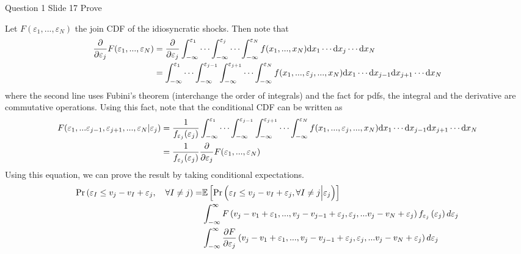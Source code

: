 \documentclass{article}
\begin{document}
\begin{problem}{Question 1 Slide 17}
Prove
\end{problem}
\begin{solution}
Let $F(\varepsilon_1,...,\varepsilon_N)$ the join CDF of the idiosyncratic shocks. Then note that
\begin{align*}
    \frac{\partial }{\partial \varepsilon_j}F(\varepsilon_1,...,\varepsilon_N) &= \frac{\partial }{\partial \varepsilon_j} \int_{-\infty}^{\varepsilon_1}\cdots\int_{-\infty}^{\varepsilon_j}\cdots\int_{-\infty}^{\varepsilon_N} f(x_1,...,x_N)\mathrm{d}x_1\cdots\mathrm{d}x_j\cdots\mathrm{d}x_N \\
     &= \int_{-\infty}^{\varepsilon_1}\cdots\int_{-\infty}^{\varepsilon_{j-1}}\int_{-\infty}^{\varepsilon_{j+1}}\cdots\int_{-\infty}^{\varepsilon_N} f(x_1,...,\varepsilon_j,...,x_N)\mathrm{d}x_1\cdots\mathrm{d}x_{j-1}\mathrm{d}x_{j+1}\cdots\mathrm{d}x_N
\end{align*}
where the second line uses Fubini's theorem (interchange the order of integrals) and the fact for pdfs, the integral and the derivative are commutative operations. Using this fact, note that the conditional CDF can be written as 
\begin{align*}
    F(\varepsilon_1,...\varepsilon_{j-1},\varepsilon_{j+1},...,\varepsilon_N\vert\varepsilon_j) &= \frac{1}{f_{\varepsilon_j}(\varepsilon_j)} \int_{-\infty}^{\varepsilon_1}\cdots\int_{-\infty}^{\varepsilon_{j-1}}\int_{-\infty}^{\varepsilon_{j+1}}\cdots\int_{-\infty}^{\varepsilon_N} f(x_1,...,\varepsilon_j,...,x_N)\mathrm{d}x_1\cdots\mathrm{d}x_{j-1}\mathrm{d}x_{j+1}\cdots\mathrm{d}x_N \\ 
    &=\frac{1}{f_{\varepsilon_j}(\varepsilon_j)} \frac{\partial }{\partial \varepsilon_j}F(\varepsilon_1,...,\varepsilon_N)
\end{align*}
Using this equation, we can prove the result by taking conditional expectations. 
\begin{align*}
\Pr\left(\varepsilon_{I}\leq v_{j}-v_{I} + \varepsilon_{j}, \quad \forall I \neq j\right)=&\mathbb{E}\left[\Pr\left(\varepsilon_{I}\leq v_{j}-v_{I} + \varepsilon_{j}, \forall I \neq j\Big\vert \varepsilon_{j}\right)\right]\\
&\int_{-\infty}^{\infty} F\left(v_{j}-v_{1} + \varepsilon_{1},..., v_{j}-v_{j-1} + \varepsilon_{j},\varepsilon_{j},...v_{j}-v_{N} + \varepsilon_{j}\right) f_{\varepsilon_j}\left(\varepsilon_{j}\right) d \varepsilon_{j}\\
&\int_{-\infty}^{\infty} \frac{\partial F}{\partial \varepsilon_{j}}\left(v_{j}-v_{1} + \varepsilon_{1},..., v_{j}-v_{j-1} + \varepsilon_{j},\varepsilon_{j},...v_{j}-v_{N} + \varepsilon_{j}\right) d \varepsilon_{j}
\end{align*}
\end{solution}
\end{document}
